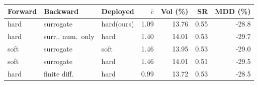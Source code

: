 \begin{tabular}{@{}lllrrrr@{}}
\toprule
Forward & Backward & Deployed & $\bar{c}$ & Vol (\%) & SR & MDD (\%)\\
\midrule
hard & surrogate & hard\;(ours) & 1.09 & 13.76 & 0.55 & -28.8\\
hard & surr., num.\ only & hard & 1.40 & 14.01 & 0.53 & -29.7\\
soft & surrogate & soft & 1.46 & 13.95 & 0.53 & -29.0\\
soft & surrogate & hard & 1.46 & 14.01 & 0.51 & -29.5\\
hard & finite diff.\ & hard & 0.99 & 13.72 & 0.53 & -28.5\\
\bottomrule
\end{tabular}
